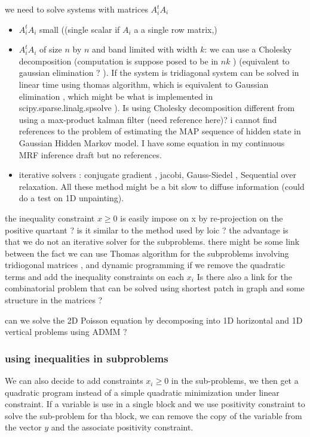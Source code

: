 \documentclass[11pt]{article}
\begin{document}
we need to solve systems with matrices $A_i^tA_i$
\begin{itemize}
\item 
$A_i^tA_i$ small ((single scalar if $A_i$ a a single row matrix,)
\item $A_i^tA_i$ of size $n$ by $n$ and band limited with width $k$: we can use a Cholesky decomposition (computation is suppose posed to be in $nk$ ) (equivalent to gaussian elimination ? ). If the system is tridiagonal  system can be solved in linear time using thomas algorithm, which is equivalent to Gaussian elimination , which might be what is implemented in scipy.sparse.linalg.spsolve ). Is using Cholesky decomposition different from using a max-product kalman filter (need reference here)? i cannot find references to the problem of estimating the MAP sequence of hidden state in Gaussian Hidden Markov model. I have some equation in my continuous MRF inference draft but no references.

\item  iterative solvers : conjugate gradient , jacobi, Gauss-Siedel , Sequential over relaxation. All these method might be a bit slow to diffuse information (could do a test on 1D unpainting). 

 \end{itemize}
the inequality constraint $x\geq 0$ is easily impose on x by re-projection on the positive quartant ? 
is it similar to the method used by loic ? 
the advantage is that we do not an iterative solver for the subproblems.
there might be some link between the fact we can use Thomas algorithm for the subproblems involving tridiogonal matrices , and dynamic programming if we remove the quadratic terms and add the inequality  constraints on each $x_i$ 
Is there also a link for the combinatorial problem that can be solved using shortest patch in graph and some structure in the matrices  ? 

can we solve the 2D Poisson equation by decomposing into 1D horizontal and 1D vertical problems using ADMM ? 


\subsubsection{using inequalities in subproblems}

We can also decide to add constraints $x_i\geq 0$ in the sub-problems, we then get a quadratic program instead of a simple quadratic minimization under linear constraint.
If a variable is use in  a single block and we use positivity constraint to solve the sub-problem for tha block, we can remove the copy of the variable from the vector $y$ and the associate positivity constraint.
\end{document}
